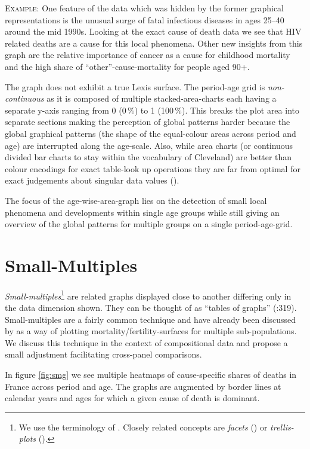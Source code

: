 \documentclass[a4paper]{scrartcl}
\begin{document}
\textsc{Example:} One feature of the data which was hidden by the former graphical representations is the unusual surge of fatal infectious diseases in ages 25--40 around the mid 1990s. Looking at the exact cause of death data we see that HIV related deaths are a cause for this local phenomena. Other new insights from this graph are the relative importance of cancer as a cause for childhood mortality and the high share of \enquote{other}-cause-mortality for people aged 90+.

The graph does not exhibit a true Lexis surface. The period-age grid is \emph{non-continuous} as it is composed of multiple stacked-area-charts each having a separate y-axis ranging from 0 (0\,\%) to 1 (100\,\%). This breaks the plot area into separate sections making the perception of global patterns harder because the global graphical patterns (the shape of the equal-colour areas across period and age) are interrupted along the age-scale. Also, while area charts (or continuous divided bar charts to stay within the vocabulary of Cleveland) are better than colour encodings for exact table-look up operations they are far from optimal for exact judgements about singular data values (\cite{Cleveland1994}).

The focus of the age-wise-area-graph lies on the detection of small local phenomena and developments within single age groups while still giving an overview of the global patterns for multiple groups on a single period-age-grid.

\section*{Small-Multiples}

\emph{Small-multiples}\footnote{We use the terminology of \textcite{Tufte1990}. Closely related concepts are \emph{facets} (\cite{Wilkinson2005}) or \emph{trellis-plots} (\cite{Becker1996}).} are related graphs displayed close to another differing only in the data dimension shown. They can be thought of as \enquote{tables of graphs} (\cite{Wilkinson2005}:319). Small-multiples are a fairly common technique and have already been discussed by \textcite{Vaupel1987} as a way of plotting mortality/fertility-surfaces for multiple sub-populations. We discuss this technique in the context of compositional data and propose a small adjustment facilitating cross-panel comparisons.

In figure \ref{fig:smg} we see multiple heatmaps of cause-specific shares of deaths in France across period and age. The graphs are augmented by border lines at calendar years and ages for which a given cause of death is dominant. 
\end{document}
